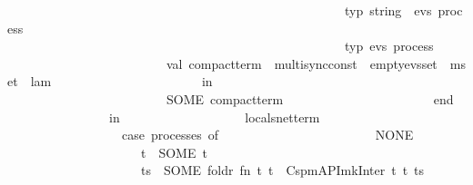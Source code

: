 \begin{isabellebody}
\ \ \ \ \ \ \ \ \ \ \ \ \ \ \ \ \ \ \ \ \ \ \ \ \ \ \ \ \ \ \ \ \ \ \ \ \ \ \ \ \ \ \ \ \ \ \ \ \ \ \ \ \ {\isacharat}{\kern0pt}{\isacharbraceleft}{\kern0pt}typ\ {\isachardoublequote}{\kern0pt}string\ {\isasymRightarrow}\ {\isacharparenleft}{\kern0pt}evs{\isacharparenright}{\kern0pt}\ process{\isachardoublequote}{\kern0pt}{\isacharbraceright}{\kern0pt}\ {\isacharminus}{\kern0pt}{\isacharminus}{\kern0pt}{\isachargreater}{\kern0pt}\ \isanewline
\ \ \ \ \ \ \ \ \ \ \ \ \ \ \ \ \ \ \ \ \ \ \ \ \ \ \ \ \ \ \ \ \ \ \ \ \ \ \ \ \ \ \ \ \ \ \ \ \ \ \ \ \ {\isacharat}{\kern0pt}{\isacharbraceleft}{\kern0pt}typ\ {\isachardoublequote}{\kern0pt}{\isacharparenleft}{\kern0pt}evs{\isacharparenright}{\kern0pt}\ process{\isachardoublequote}{\kern0pt}{\isacharbraceright}{\kern0pt}{\isacharparenright}{\kern0pt}\isanewline
\ \ \ \ \ \ \ \ \ \ \ \ \ \ \ \ \ \ \ \ \ \ \ \ \ val\ compact{\isacharunderscore}{\kern0pt}term\ {\isacharequal}{\kern0pt}\ multisync{\isacharunderscore}{\kern0pt}const\ {\isachardollar}{\kern0pt}\ empty{\isacharunderscore}{\kern0pt}evs{\isacharunderscore}{\kern0pt}set\ {\isachardollar}{\kern0pt}\ mset\ {\isachardollar}{\kern0pt}\ lam\isanewline
\ \ \ \ \ \ \ \ \ \ \ \ \ \ \ \ \ \ \ \ \ \ \ in\isanewline
\ \ \ \ \ \ \ \ \ \ \ \ \ \ \ \ \ \ \ \ \ \ \ \ \ SOME\ compact{\isacharunderscore}{\kern0pt}term\isanewline
\ \ \ \ \ \ \ \ \ \ \ \ \ \ \ \ \ \ \ \ \ \ \ end{\isacharparenright}{\kern0pt}\isanewline
\ \ \ \ \ \ \ \ \ \ \ \ \ \ \ \ in\isanewline
\ \ \ \ \ \ \ \ \ \ \ \ \ \ \ \ \ \ \ locals{\isacharunderscore}{\kern0pt}net{\isacharunderscore}{\kern0pt}term\isanewline
\ \ \ \ \ \ \ \ \ \ \ \ \ \ \ \ \ \ {\isacharparenleft}{\kern0pt}{\isacharasterisk}{\kern0pt}{\isacharparenleft}{\kern0pt}case\ processes\ of\isanewline
\ \ \ \ \ \ \ \ \ \ \ \ \ \ \ \ \ \ \ \ \ \ {\isacharbrackleft}{\kern0pt}{\isacharbrackright}{\kern0pt}\ {\isacharequal}{\kern0pt}{\isachargreater}{\kern0pt}\ NONE\isanewline
\ \ \ \ \ \ \ \ \ \ \ \ \ \ \ \ \ \ \ \ {\isacharbar}{\kern0pt}\ {\isacharbrackleft}{\kern0pt}t{\isacharbrackright}{\kern0pt}\ {\isacharequal}{\kern0pt}{\isachargreater}{\kern0pt}\ SOME\ t\isanewline
\ \ \ \ \ \ \ \ \ \ \ \ \ \ \ \ \ \ \ \ {\isacharbar}{\kern0pt}\ ts\ {\isacharequal}{\kern0pt}{\isachargreater}{\kern0pt}\ SOME\ {\isacharparenleft}{\kern0pt}foldr{}\ {\isacharparenleft}{\kern0pt}fn\ {\isacharparenleft}{\kern0pt}t{}{\isacharcomma}{\kern0pt}\ t{}{\isacharparenright}{\kern0pt}\ {\isacharequal}{\kern0pt}{\isachargreater}{\kern0pt}\ Cspm{\isacharunderscore}{\kern0pt}API{\isachardot}{\kern0pt}mk{\isacharunderscore}{\kern0pt}Inter\ t{}\ t{}{\isacharparenright}{\kern0pt}\ ts{\isacharparenright}{\kern0pt}{\isacharparenright}{\kern0pt}\isanewline

\end{isabellebody}

